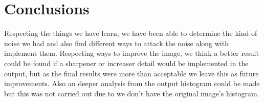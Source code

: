 \section{Conclusions}
\label{sec:image1_conclusions}
Respecting the things we have learn, we have been able to determine the kind of noise we had and also find different ways to attack the noise along with implement them. Respecting ways to improve the image, we think a better result could be found if a sharpener or increaser detail would be implemented in the output, but as the final results were more than acceptable we leave this as future improvements. Also an deeper analysis from the output histogram could be made but this was not carried out due to we don't have the original image's histogram.